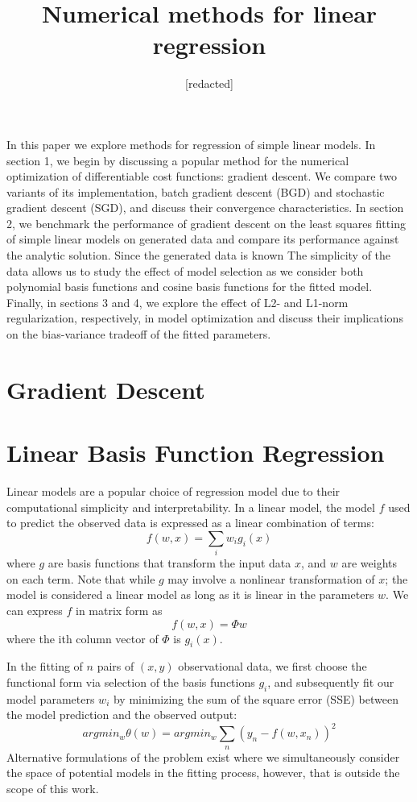 \documentclass[12pt]{article}
\begin{document}
 
\title{Numerical methods for linear regression}
\author{[redacted]}
\maketitle
 
In this paper we explore methods for regression of simple linear models. In section 1, we begin by discussing a popular method for the numerical optimization of differentiable cost functions: gradient descent. We compare two variants of its implementation, batch gradient descent (BGD) and stochastic gradient descent (SGD), and discuss their convergence characteristics. In section 2, we benchmark the performance of gradient descent on the least squares fitting of simple linear models on generated data and compare its performance against the analytic solution. Since the generated data is known The simplicity of the data allows us to study the effect of model selection as we consider both polynomial basis functions and cosine basis functions for the fitted model. Finally, in sections 3 and 4, we explore the effect of L2- and L1-norm regularization, respectively, in model optimization and discuss their implications on the bias-variance tradeoff of the fitted parameters.

\section{Gradient Descent}

\section{Linear Basis Function Regression}

Linear models are a popular choice of regression model due to their computational simplicity and interpretability. In a linear model, the model $f$ used to predict the observed data is expressed as a linear combination of terms:
$$ f(w,x) = \sum_i w_ig_i(x) $$
where $g$ are basis functions that transform the input data $x$, and $w$ are weights on each term. Note that while $g$ may involve a nonlinear transformation of $x$; the model is considered a linear model as long as it is linear in the parameters $w$. We can express $f$ in matrix form as
$$f(w,x) = \Phi w$$
where the ith column vector of $\Phi$ is $g_i(x)$. 

In the fitting of $n$ pairs of $(x,y)$ observational data, we first choose the functional form via selection of the basis functions $g_i$, and subsequently fit our model parameters $w_i$ by minimizing the sum of the square error (SSE) between the model prediction and the observed output: 
$$ argmin_w \theta(w) = argmin_w \sum_n (y_n - f(w,x_n))^2$$ %
Alternative formulations of the problem exist where we simultaneously consider the space of potential models in the fitting process, however, that is outside the scope of this work.
\end{document}
